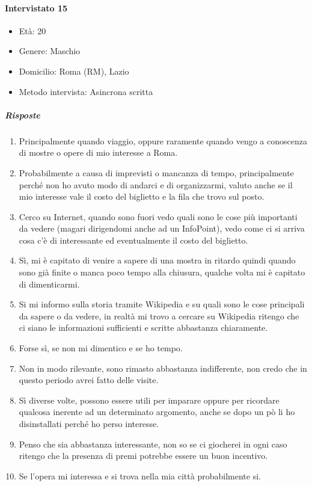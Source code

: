 \documentclass{article}
\begin{document}
\paragraph{Intervistato 15}
\begin{itemize}
\item Età: 20
\item Genere: Maschio
\item Domicilio: Roma (RM), Lazio
\item Metodo intervista: Asincrona scritta
\end{itemize}
\subparagraph{Risposte}
\begin{enumerate}
\item Principalmente quando viaggio, oppure raramente quando vengo a conoscenza di mostre o opere di mio interesse a Roma.
\item Probabilmente a causa di imprevisti o mancanza di tempo, principalmente perché non ho avuto modo di andarci e di organizzarmi, valuto anche se il mio interesse vale il costo del biglietto e la fila che trovo sul posto.
\item Cerco su Internet, quando sono fuori vedo quali sono le cose più importanti da vedere (magari dirigendomi anche ad un InfoPoint), vedo come ci si arriva cosa c’è di interessante ed eventualmente il costo del biglietto.
\item Sì, mi è capitato di venire a sapere di una mostra in ritardo quindi quando sono già finite o manca poco tempo alla chiusura, qualche volta mi è capitato di dimenticarmi.
\item Si mi informo sulla storia tramite Wikipedia e su quali sono le cose principali da sapere o da vedere, in realtà mi trovo a cercare su Wikipedia ritengo che ci siano le informazioni sufficienti e scritte abbastanza chiaramente.
\item Forse sì, se non mi dimentico e se ho tempo.
\item Non in modo rilevante, sono rimasto abbastanza indifferente, non credo che in questo periodo avrei fatto delle visite.
\item Sì diverse volte, possono essere utili per imparare oppure per ricordare qualcosa inerente ad un determinato argomento, anche se dopo un pò li ho disinstallati perché ho perso interesse.
\item Penso che sia abbastanza interessante, non so se ci giocherei in ogni caso ritengo che la presenza di premi potrebbe essere un buon incentivo.
\item Se l’opera mi interessa e si trova nella mia città probabilmente si.
\end{enumerate}
\end{document}
